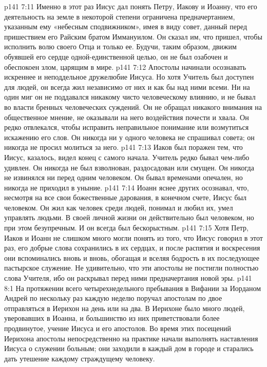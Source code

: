 \vs p141 7:11 Именно в этот раз Иисус дал понять Петру, Иакову и Иоанну, что его деятельность на земле в некоторой степени ограничена предначертанием, указанным ему «небесным сподвижником», имея в виду совет, данный перед пришествием его Райским братом Иммануилом. Он сказал им, что пришел, чтобы исполнить волю своего Отца и только ее. Будучи, таким образом, движим обуявшей его сердце одной\hyp{}единственной целью, он не был озабочен и обеспокоен злом, царящим в мире.
\vs p141 7:12 Апостолы начинали осознавать искреннее и неподдельное дружелюбие Иисуса. Но хотя Учитель был доступен для людей, он всегда жил независимо от них и как бы над ними всеми. Ни на один миг он не поддавался никакому чисто человеческому влиянию, и не бывал во власти бренных человеческих суждений. Он не обращал никакого внимания на общественное мнение, не оказывали на него воздействия почести и хвала. Он редко отвлекался, чтобы исправить неправильное понимание или возмутиться искажению его слов. Он никогда ни у одного человека не спрашивал совета; он никогда не просил молиться за него.
\vs p141 7:13 Иаков был поражен тем, что Иисус, казалось, видел конец с самого начала. Учитель редко бывал чем\hyp{}либо удивлен. Он никогда не был взволнован, раздосадован или смущен. Он никогда не извинялся ни перед одним человеком. Он бывал временами опечален, но никогда не приходил в уныние.
\vs p141 7:14 Иоанн яснее других осознавал, что, несмотря на все свои божественные дарования, в конечном счете, Иисус был человеком. Он жил как человек среди людей, понимал и любил их, умел управлять людьми. В своей личной жизни он действительно был человеком, но при этом безупречным. И он всегда был бескорыстным.
\vs p141 7:15 Хотя Петр, Иаков и Иоанн не слишком много могли понять из того, что Иисус говорил в этот раз, его добрые слова сохранились в их сердцах, и после распятия и воскресения они вспоминались вновь и вновь, обогащая и вселяя бодрость в их последующее пастырское служение. Не удивительно, что эти апостолы не постигли полностью слова Учителя, ибо он раскрывал перед ними предначертания новой эры.
\vs p141 8:1 На протяжении всего четырехнедельного пребывания в Вифании за Иорданом Андрей по нескольку раз каждую неделю поручал апостолам по двое отправляться в Иерихон на день или на два. В Иерихоне было много людей, уверовавших в Иоанна, и большинство из них приветствовали более продвинутое, учение Иисуса и его апостолов. Во время этих посещений Иерихона апостолы непосредственно на практике начали выполнять наставления Иисуса о служении больным; они заходили в каждый дом в городе и старались дать утешение каждому страждущему человеку.
